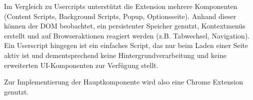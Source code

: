 Im Vergleich zu Usercripts unterstützt die Extension mehrere Komponenten (Content Scripts, Background Scripts, Popup, Optionsseite).
Anhand dieser können der DOM beobachtet, ein persistenter Speicher genutzt, Kontextmenüs erstellt und auf Browseraktionen reagiert werden (z.B. Tabwechsel, Navigation).
Ein Userscript hingegen ist ein einfaches Script, das nur beim Laden einer Seite aktiv ist und dementsprechend keine Hintergrundverarbeitung und keine erweiterten UI-Komponenten
zur Verfügung stellt.

Zur Implementierung der Hauptkomponente wird also eine Chrome Extension genutzt.

    
    
    
